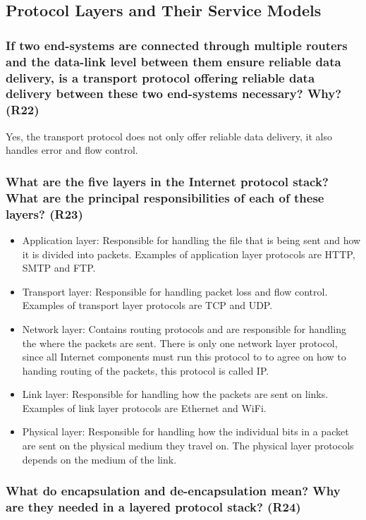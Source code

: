 \subsection{Protocol Layers and Their Service Models}

\subsubsection{If two end-systems are connected through multiple routers and the data-link level between them ensure reliable data delivery, is a transport protocol offering reliable data delivery between these two end-systems necessary? Why? (R22)}

Yes, the transport protocol does not only offer reliable data delivery, it also handles error and flow control.


\subsubsection{What are the five layers in the Internet protocol stack? What are the principal responsibilities of each of these layers? (R23)}
\begin{itemize}
    \item Application layer: Responsible for handling the file that is being sent and how it is divided into packets. Examples of application layer protocols are HTTP, SMTP and FTP.
    \item Transport layer: Responsible for handling packet loss and flow control. Examples of transport layer protocols are TCP and UDP.
    \item Network layer: Contains routing protocols and are responsible for handling the where the packets are sent. There is only one network layer protocol, since all Internet components must run this protocol to to agree on how to handing routing of the packets, this protocol is called IP.
    \item Link layer: Responsible for handling how the packets are sent on links. Examples of link layer protocols are Ethernet and WiFi.
    \item Physical layer: Responsible for handling how the individual bits in a packet are sent on the physical medium they travel on. The physical layer protocols depends on the medium of the link. 
\end{itemize}


\subsubsection{What do encapsulation and de-encapsulation mean? Why are they needed in a layered protocol stack? (R24)}

